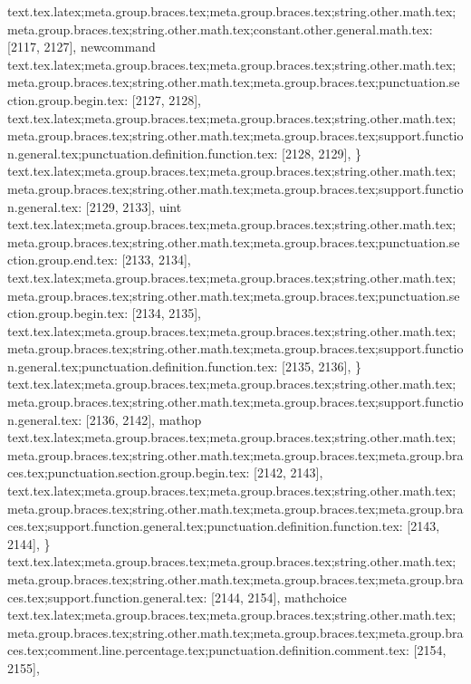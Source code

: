 {{{{{{{{{{{{{{{{{{{{{{{{{{{{{{{{{{{{{{{{{{{{{{{{{{{{text.tex.latex;meta.group.braces.tex;meta.group.braces.tex;string.other.math.tex;meta.group.braces.tex;string.other.math.tex;constant.other.general.math.tex: [2117, 2127], {newcommand}
text.tex.latex;meta.group.braces.tex;meta.group.braces.tex;string.other.math.tex;meta.group.braces.tex;string.other.math.tex;meta.group.braces.tex;punctuation.section.group.begin.tex: [2127, 2128], {{}
text.tex.latex;meta.group.braces.tex;meta.group.braces.tex;string.other.math.tex;meta.group.braces.tex;string.other.math.tex;meta.group.braces.tex;support.function.general.tex;punctuation.definition.function.tex: [2128, 2129], {\}
text.tex.latex;meta.group.braces.tex;meta.group.braces.tex;string.other.math.tex;meta.group.braces.tex;string.other.math.tex;meta.group.braces.tex;support.function.general.tex: [2129, 2133], {uint}
text.tex.latex;meta.group.braces.tex;meta.group.braces.tex;string.other.math.tex;meta.group.braces.tex;string.other.math.tex;meta.group.braces.tex;punctuation.section.group.end.tex: [2133, 2134], {}}
text.tex.latex;meta.group.braces.tex;meta.group.braces.tex;string.other.math.tex;meta.group.braces.tex;string.other.math.tex;meta.group.braces.tex;punctuation.section.group.begin.tex: [2134, 2135], {{}
text.tex.latex;meta.group.braces.tex;meta.group.braces.tex;string.other.math.tex;meta.group.braces.tex;string.other.math.tex;meta.group.braces.tex;support.function.general.tex;punctuation.definition.function.tex: [2135, 2136], {\}
text.tex.latex;meta.group.braces.tex;meta.group.braces.tex;string.other.math.tex;meta.group.braces.tex;string.other.math.tex;meta.group.braces.tex;support.function.general.tex: [2136, 2142], {mathop}
text.tex.latex;meta.group.braces.tex;meta.group.braces.tex;string.other.math.tex;meta.group.braces.tex;string.other.math.tex;meta.group.braces.tex;meta.group.braces.tex;punctuation.section.group.begin.tex: [2142, 2143], {{}
text.tex.latex;meta.group.braces.tex;meta.group.braces.tex;string.other.math.tex;meta.group.braces.tex;string.other.math.tex;meta.group.braces.tex;meta.group.braces.tex;support.function.general.tex;punctuation.definition.function.tex: [2143, 2144], {\}
text.tex.latex;meta.group.braces.tex;meta.group.braces.tex;string.other.math.tex;meta.group.braces.tex;string.other.math.tex;meta.group.braces.tex;meta.group.braces.tex;support.function.general.tex: [2144, 2154], {mathchoice}
text.tex.latex;meta.group.braces.tex;meta.group.braces.tex;string.other.math.tex;meta.group.braces.tex;string.other.math.tex;meta.group.braces.tex;meta.group.braces.tex;comment.line.percentage.tex;punctuation.definition.comment.tex: [2154, 2155], {%
}}}}}}}}}}}}}}}}}}}}}}}}}}}}}}}}}}}}}}}}}}}}}}}}}}}}}}}}}}
